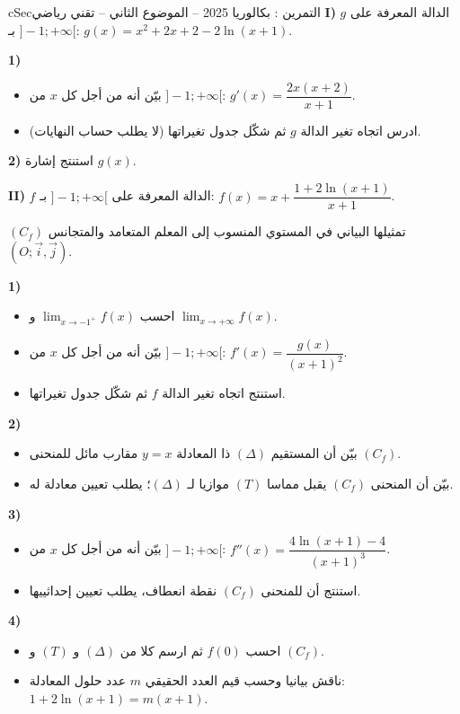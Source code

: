 \documentclass[12pt,a4paper]{article}
\newenvironment{BOX}[2]{\begin{otherlanguage}{english}\begin{arbox}{#1}{#2}}{\end{arbox}\end{otherlanguage}}
\newcounter{exo}
\newenvironment{tamrin}[1]{\stepcounter{exo}\begin{BOX}{cSec}{التمرين \theexo: #1}}{\end{BOX}}
\newenvironment{sq}{\begin{itemize}[leftmargin=2.4em,itemsep=3pt]}{\end{itemize}}
\newcommand{\qa}{\item[(أ)]}\newcommand{\qb}{\item[(ب)]}\newcommand{\qc}{\item[(جـ)]}\newcommand{\qd}{\item[(د)]}\newcommand{\qe}{\item[(هـ)]}
\begin{document}
\begin{tamrin}{بكالوريا 2025 -- الموضوع الثاني -- تقني رياضي}
\textbf{I)} $g$ الدالة المعرفة على $]-1;+\infty[$ بـ: $g(x)=x^2+2x+2-2\ln(x+1)$.

\textbf{1)}
\begin{sq}
\qa بيّن أنه من أجل كل $x$ من $]-1;+\infty[$: $g'(x)=\dfrac{2x(x+2)}{x+1}$.
\qb ادرس اتجاه تغير الدالة $g$ ثم شكّل جدول تغيراتها (لا يطلب حساب النهايات).
\end{sq}
\textbf{2)} استنتج إشارة $g(x)$.

\textbf{II)} $f$ الدالة المعرفة على $]-1;+\infty[$ بـ: $f(x)=x+\dfrac{1+2\ln(x+1)}{x+1}$.

$(C_f)$ تمثيلها البياني في المستوي المنسوب إلى المعلم المتعامد والمتجانس $(O;\vec i,\vec j)$.

\textbf{1)}
\begin{sq}
\qa احسب $\displaystyle\lim_{x\to-1^+}f(x)$ و $\displaystyle\lim_{x\to+\infty}f(x)$.
\qb بيّن أنه من أجل كل $x$ من $]-1;+\infty[$: $f'(x)=\dfrac{g(x)}{(x+1)^2}$.
\qc استنتج اتجاه تغير الدالة $f$ ثم شكّل جدول تغيراتها.
\end{sq}
\textbf{2)}
\begin{sq}
\qa بيّن أن المستقيم $(\Delta)$ ذا المعادلة $y=x$ مقارب مائل للمنحنى $(C_f)$.
\qb بيّن أن المنحنى $(C_f)$ يقبل مماسا $(T)$ موازيا لـ $(\Delta)$؛ يطلب تعيين معادلة له.
\end{sq}
\textbf{3)}
\begin{sq}
\qa بيّن أنه من أجل كل $x$ من $]-1;+\infty[$: $f''(x)=\dfrac{4\ln(x+1)-4}{(x+1)^3}$.
\qb استنتج أن للمنحنى $(C_f)$ نقطة انعطاف، يطلب تعيين إحداثييها.
\end{sq}
\textbf{4)}
\begin{sq}
\qa احسب $f(0)$ ثم ارسم كلا من $(\Delta)$ و $(T)$ و $(C_f)$.
\qb ناقش بيانيا وحسب قيم العدد الحقيقي $m$ عدد حلول المعادلة: $1+2\ln(x+1)=m(x+1)$.
\end{sq}
\end{tamrin}
\end{document}
